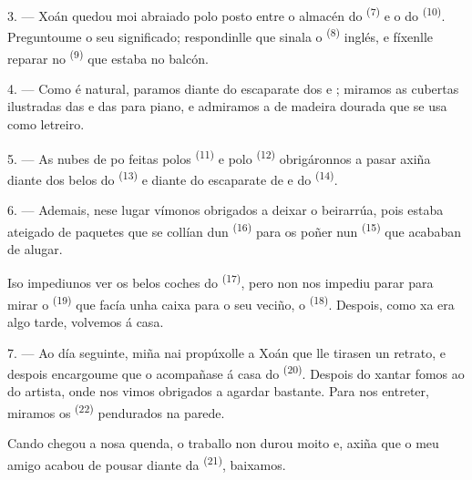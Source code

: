 3. --- Xoán quedou moi abraiado polo  posto entre o almacén do
 \textsuperscript{(7)} e o do 
\textsuperscript{(10)}. Preguntoume o seu significado; respondinlle que sinala o
 \textsuperscript{(8)} inglés, e fíxenlle reparar no
 \textsuperscript{(9)} que estaba no balcón.

\VUsaut{3.0mm}

4. --- Como é natural, paramos diante do escaparate dos    e ; miramos as cubertas
ilustradas das  e das  para piano, e
admiramos a  de madeira dourada que se usa como letreiro.

5. --- As nubes de po feitas polos  \textsuperscript{(11)} e polo
 \textsuperscript{(12)} obrigáronnos a pasar axiña diante dos
belos  do  \textsuperscript{(13)} e diante
do escaparate de  e  do 
\textsuperscript{(14)}.

6. --- Ademais, nese lugar vímonos obrigados a deixar o beirarrúa, pois estaba
ateigado de paquetes que se collían dun 
\textsuperscript{(16)} para os poñer nun  \textsuperscript{(15)} que
acababan de alugar.

Iso impediunos ver os belos coches do  \textsuperscript{(17)}, pero
non nos impediu parar para mirar o  \textsuperscript{(19)} que facía
unha caixa para o seu veciño, o 
\textsuperscript{(18)}. Despois, como xa era algo tarde, volvemos á casa.

\VUsaut{3.0mm}

7. --- Ao día seguinte, miña nai propúxolle a Xoán que lle tirasen un retrato, e
despois encargoume que o acompañase á casa do 
\textsuperscript{(20)}. Despois do xantar fomos ao  do artista, onde
nos vimos obrigados a agardar bastante. Para nos entreter, miramos os
 \textsuperscript{(22)} pendurados na parede.

Cando chegou a nosa quenda, o traballo non durou moito e, axiña que o meu amigo acabou
de pousar diante da  \textsuperscript{(21)}, baixamos.

